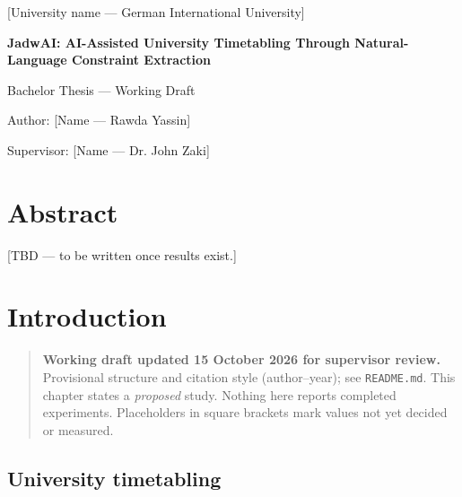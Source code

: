 \documentclass[
  11pt,a4paper,oneside]{report}
\author{}
\date{}
\begin{document}
\begin{titlepage}
\centering
{\large [University name --- German International University]\par{}\par}
\vspace{2.5cm}
{\Huge\bfseries JadwAI: AI-Assisted University Timetabling Through Natural-Language Constraint Extraction\par}
\vspace{1.5cm}
{\Large Bachelor Thesis --- Working Draft\par}
\vspace{2cm}
{\large Author: [Name --- Rawda Yassin]\par Supervisor: [Name --- Dr. John Zaki]\par [Month Year --- TBD]\par}
\vfill
{}
\end{titlepage}
\chapter*{Abstract}
[TBD --- to be written once results exist.]
\tableofcontents
\clearpage

\hypertarget{introduction}{%
\chapter{Introduction}\label{introduction}}

\begin{quote}
\textbf{Working draft updated 15 October 2026 for supervisor review.} Provisional structure and
citation style (author--year); see \texttt{README.md}. This chapter
states a \emph{proposed} study. Nothing here reports completed
experiments. Placeholders in square brackets mark values not yet decided
or measured.
\end{quote}

\hypertarget{university-timetabling}{%
\section{University timetabling}\label{university-timetabling}}
\end{document}
